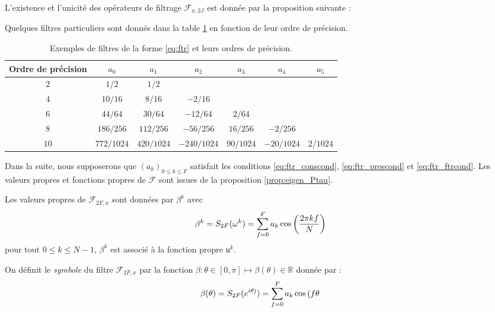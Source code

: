 L'existence et l'unicité des opérateurs de filtrage $\mathcal{F}_{x,2J}$ est donnée par la proposition suivante :


















Quelques filtres particuliers sont donnés dans la table \ref{tab:filter} en fonction de leur ordre de précision.
\begin{table}[htbp]
\begin{center}
\begin{tabular}{|c||cccccc|}
\hline
\textbf{Ordre de précision} & $a_0$ & $a_1$ & $a_2$ & $a_3$ & $a_4$ & $a_5$ \\
\hline \hline
$2$ & $1/2$ & $1/2$ & & & & \\
\hline
$4$ & $10/16$ & $8/16$ & $-2/16$ & & & \\
\hline
$6$ & $44/64$ & $30/64$ & $-12/64$ & $2/64$ & & \\
\hline
$8$ & $186/256$ & $112/256$ & $-56/256$ & $16/256$ & $-2/256$ & \\
\hline
$10$ & $772/1024$ & $420/1024$ & $-240/1024$ & $90/1024$ & $-20/1024$ & $2/1024$ \\
\hline
\end{tabular}
\end{center}
\caption{Exemples de filtres de la forme \eqref{eq:ftr} et leurs ordres de précision.}
\label{tab:filter}
\end{table}
Dans la suite, nous supposerons que $(a_k)_{0 \leq k \leq F}$ satisfait les conditions \eqref{eq:ftr_conscond}, \eqref{eq:ftr_prescond} et \eqref{eq:ftr_ftrcond}.
Les valeurs propres et fonctions propres de $\mathcal{F}$ sont issues de la proposition \ref{prop:eigen_Ptau}.

\begin{theoreme}
Les valeurs propres de $\mathcal{F}_{2F,x}$ sont données par $\beta^k$ avec 
\begin{equation}
\beta^k = S_{2F}(\omega^k) = \displaystyle\sum\limits_{f=0}^F a_k \cos \left( \dfrac{2 \pi k f}{N} \right)
\end{equation}
pour tout $0 \leq k \leq N-1$, $\beta^k$ est associé à la fonction propre $\mathfrak{u}^k$.
\end{theoreme}

On définit le \textit{symbole} du filtre $\mathcal{F}_{2F,x}$ par la fonction $\beta : \theta \in [0, \pi] \mapsto \beta(\theta) \in \mathbb{R}$ donnée par :
\begin{equation}
\beta (\theta) = S_{2F}(e^{i\theta)}) = \displaystyle\sum\limits_{f=0}^F a_k \cos \left( f \theta \right.
\end{equation}

